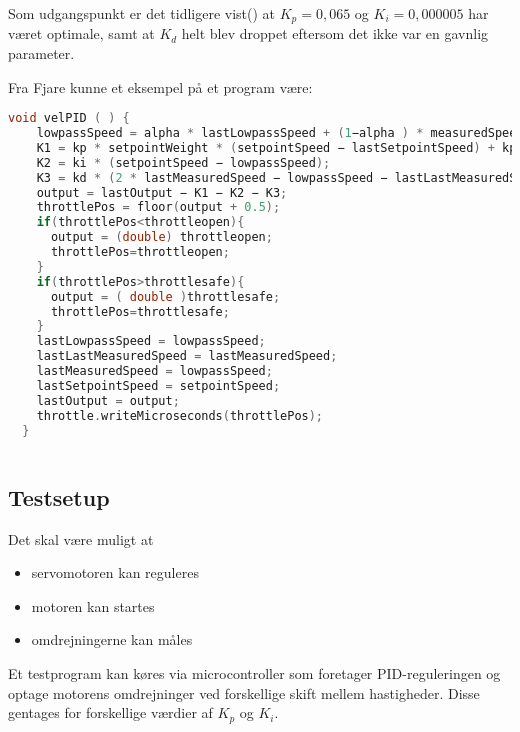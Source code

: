 Som udgangspunkt er det tidligere vist(\cite{pid1}) at $K_p=0,065$ og $K_i=0,000005$ har været optimale, samt at $K_d$ helt blev droppet eftersom det ikke var en gavnlig parameter.

Fra Fjare\cite{pid1} kunne et eksempel på et program være:
\begin{lstlisting}[language=C,basicstyle=\ttfamily]
  void velPID ( ) {
    lowpassSpeed = alpha * lastLowpassSpeed + (1−alpha ) * measuredSpeed;
    K1 = kp * setpointWeight * (setpointSpeed − lastSetpointSpeed) + kp * (lastMeasuredSpeed − lowpassSpeed);
    K2 = ki * (setpointSpeed − lowpassSpeed);
    K3 = kd * (2 * lastMeasuredSpeed − lowpassSpeed − lastLastMeasuredSpeed);
    output = lastOutput − K1 − K2 − K3;
    throttlePos = floor(output + 0.5);
    if(throttlePos<throttleopen){
      output = (double) throttleopen;
      throttlePos=throttleopen;
    }
    if(throttlePos>throttlesafe){
      output = ( double )throttlesafe;
      throttlePos=throttlesafe;
    }
    lastLowpassSpeed = lowpassSpeed;
    lastLastMeasuredSpeed = lastMeasuredSpeed;
    lastMeasuredSpeed = lowpassSpeed;
    lastSetpointSpeed = setpointSpeed;
    lastOutput = output;
    throttle.writeMicroseconds(throttlePos);
  }
  
\end{lstlisting}

\subsection{Testsetup}
\label{sec:tests}

Det skal være muligt at
\begin{itemize}
\item servomotoren kan reguleres 
\item motoren kan startes
\item omdrejningerne kan måles
\end{itemize}

Et testprogram kan køres via microcontroller som foretager PID-reguleringen og optage motorens omdrejninger ved forskellige skift mellem hastigheder. Disse gentages for forskellige værdier af $K_p$ og $K_i$.